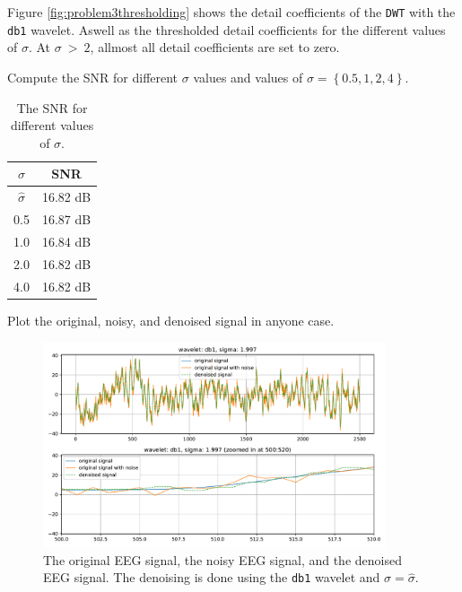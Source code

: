 Figure \ref{fig:problem3thresholding} shows the detail coefficients of the \texttt{DWT} with the \texttt{db1} wavelet. Aswell as the thresholded detail coefficients for the different values of $\sigma$. At $\sigma\ >\ 2$, allmost all detail coefficients are set to zero. 



\begin{tcolorbox}[colback=blue!5!white,colframe=blue!75!black,title=Problem 3.a]
    Compute the SNR for different $\sigma$ values and values of $\sigma = \left \lbrace 0.5, 1, 2, 4 \right \rbrace$.
\end{tcolorbox}


\begin{table}[H]
    \label{tbl:snr_values_for_different_sigmas}
    \centering

    \begin{tabular}{c|c}
        \hline
        $\sigma$ & SNR \\
        \hline
        
        $\hat{\sigma}$ & 16.82 dB \\
        0.5 & 16.87 dB \\
        1.0 & 16.84 dB \\
        2.0 & 16.82 dB \\
        4.0 & 16.82 dB \\

    \end{tabular}

    \caption{The SNR for different values of $\sigma$.}
\end{table}



\begin{tcolorbox}[colback=blue!5!white,colframe=blue!75!black,title=Problem 3.b]
    Plot the original, noisy, and denoised signal in anyone case.
\end{tcolorbox}


\begin{figure}[H]
    \label{fig:problem3b_plot1}
    \centering
    \includegraphics[width=0.9\textwidth]{./img/problem3-denoised-signal-wavelet-db1-sigma-1.997.pdf}
    \caption{The original EEG signal, the noisy EEG signal, and the denoised EEG signal. The denoising is done using the \texttt{db1} wavelet and $\sigma = \hat{\sigma}$.}
\end{figure}


